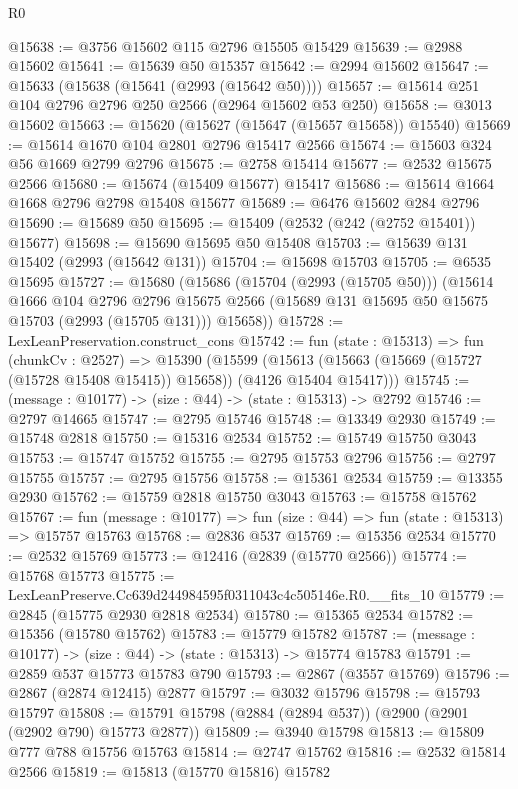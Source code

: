 \begin{lexlean}{R0}
\begin{coremodule}
@15638 := @3756 @15602 @115 @2796 @15505 @15429
@15639 := @2988 @15602
@15641 := @15639 @50 @15357
@15642 := @2994 @15602
@15647 := @15633 (@15638 (@15641 (@2993 (@15642 @50))))
@15657 := @15614 @251 @104 @2796 @2796 @250 @2566 (@2964 @15602 @53 @250)
@15658 := @3013 @15602
@15663 := @15620 (@15627 (@15647 (@15657 @15658)) @15540)
@15669 := @15614 @1670 @104 @2801 @2796 @15417 @2566
@15674 := @15603 @324 @56 @1669 @2799 @2796
@15675 := @2758 @15414
@15677 := @2532 @15675 @2566
@15680 := @15674 (@15409 @15677) @15417
@15686 := @15614 @1664 @1668 @2796 @2798 @15408 @15677
@15689 := @6476 @15602 @284 @2796
@15690 := @15689 @50
@15695 := @15409 (@2532 (@242 (@2752 @15401)) @15677)
@15698 := @15690 @15695 @50 @15408
@15703 := @15639 @131 @15402 (@2993 (@15642 @131))
@15704 := @15698 @15703
@15705 := @6535 @15695
@15727 := @15680
    (@15686
      (@15704 (@2993 (@15705 @50)))
      (@15614
        @1666
        @104
        @2796
        @2796
        @15675
        @2566
        (@15689 @131 @15695 @50 @15675 @15703 (@2993 (@15705 @131)))
        @15658))
@15728 := LexLeanPreservation.construct_cons
@15742 := fun (state : @15313) =>
  fun (chunkCv : @2527) =>
  @15390
    (@15599 (@15613 (@15663 (@15669 (@15727 (@15728 @15408 @15415)) @15658)) (@4126 @15404 @15417)))
@15745 := (message : @10177) -> (size : @44) -> (state : @15313) -> @2792
@15746 := @2797 @14665
@15747 := @2795 @15746
@15748 := @13349 @2930
@15749 := @15748 @2818
@15750 := @15316 @2534
@15752 := @15749 @15750 @3043
@15753 := @15747 @15752
@15755 := @2795 @15753 @2796
@15756 := @2797 @15755
@15757 := @2795 @15756
@15758 := @15361 @2534
@15759 := @13355 @2930
@15762 := @15759 @2818 @15750 @3043
@15763 := @15758 @15762
@15767 := fun (message : @10177) => fun (size : @44) => fun (state : @15313) => @15757 @15763
@15768 := @2836 @537
@15769 := @15356 @2534
@15770 := @2532 @15769
@15773 := @12416 (@2839 (@15770 @2566))
@15774 := @15768 @15773
@15775 := LexLeanPreserve.Cc639d244984595f0311043c4c505146e.R0.__fits_10
@15779 := @2845 (@15775 @2930 @2818 @2534)
@15780 := @15365 @2534
@15782 := @15356 (@15780 @15762)
@15783 := @15779 @15782
@15787 := (message : @10177) -> (size : @44) -> (state : @15313) -> @15774 @15783
@15791 := @2859 @537 @15773 @15783 @790
@15793 := @2867 (@3557 @15769)
@15796 := @2867 (@2874 @12415) @2877
@15797 := @3032 @15796
@15798 := @15793 @15797
@15808 := @15791 @15798 (@2884 (@2894 @537)) (@2900 (@2901 (@2902 @790) @15773 @2877))
@15809 := @3940 @15798
@15813 := @15809 @777 @788 @15756 @15763
@15814 := @2747 @15762
@15816 := @2532 @15814 @2566
@15819 := @15813 (@15770 @15816) @15782

\end{coremodule}
\end{lexlean}
